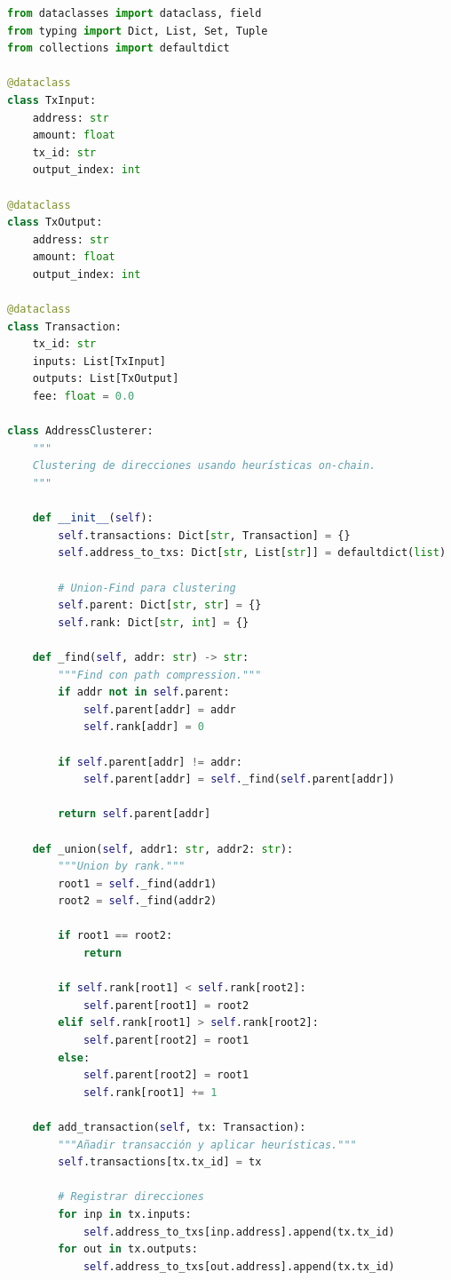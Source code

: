 \documentclass[11pt,a4paper,twoside]{book}
\theoremstyle{definition}
\theoremstyle{remark}
\begin{document}
\begin{lstlisting}[language=Python, caption={Sistema de Graph Analysis y Clustering}]
from dataclasses import dataclass, field
from typing import Dict, List, Set, Tuple
from collections import defaultdict

@dataclass
class TxInput:
    address: str
    amount: float
    tx_id: str
    output_index: int

@dataclass
class TxOutput:
    address: str
    amount: float
    output_index: int

@dataclass
class Transaction:
    tx_id: str
    inputs: List[TxInput]
    outputs: List[TxOutput]
    fee: float = 0.0

class AddressClusterer:
    """
    Clustering de direcciones usando heurísticas on-chain.
    """
    
    def __init__(self):
        self.transactions: Dict[str, Transaction] = {}
        self.address_to_txs: Dict[str, List[str]] = defaultdict(list)
        
        # Union-Find para clustering
        self.parent: Dict[str, str] = {}
        self.rank: Dict[str, int] = {}
    
    def _find(self, addr: str) -> str:
        """Find con path compression."""
        if addr not in self.parent:
            self.parent[addr] = addr
            self.rank[addr] = 0
        
        if self.parent[addr] != addr:
            self.parent[addr] = self._find(self.parent[addr])
        
        return self.parent[addr]
    
    def _union(self, addr1: str, addr2: str):
        """Union by rank."""
        root1 = self._find(addr1)
        root2 = self._find(addr2)
        
        if root1 == root2:
            return
        
        if self.rank[root1] < self.rank[root2]:
            self.parent[root1] = root2
        elif self.rank[root1] > self.rank[root2]:
            self.parent[root2] = root1
        else:
            self.parent[root2] = root1
            self.rank[root1] += 1
    
    def add_transaction(self, tx: Transaction):
        """Añadir transacción y aplicar heurísticas."""
        self.transactions[tx.tx_id] = tx
        
        # Registrar direcciones
        for inp in tx.inputs:
            self.address_to_txs[inp.address].append(tx.tx_id)
        for out in tx.outputs:
            self.address_to_txs[out.address].append(tx.tx_id)
        

\end{lstlisting}
\end{document}
